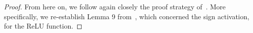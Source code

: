 \begin{proof}
{%
 
 





From here on, we follow again closely the proof strategy
of~\cite{grohewl}. More specifically, we re-establish Lemma 9 from~\cite{grohewl}, which concerned the sign activation, for the ReLU function.
  
}
\end{proof}
